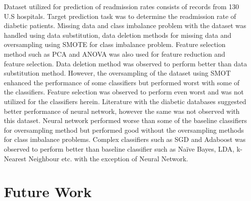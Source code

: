 \documentclass[conference]{IEEEtran}
\begin{document}
Dataset utilized for prediction of readmission rates consists of records from 130 U.S hospitals. Target prediction task was to determine the readmission rate of diabetic patients. Missing data and class imbalance problem with the dataset was handled using data substitution, data deletion methods for missing data and oversampling using SMOTE for class imbalance problem. Feature selection method such as PCA and ANOVA was also used for feature reduction and feature selection. Data deletion method was observed to perform better than data substitution method. However, the oversampling of the dataset using SMOT enhanced the performance of some classifiers but performed worst with some of the classifiers. Feature selection was observed to perform even worst and was not utilized for the classifiers herein. Literature with the diabetic databases suggested better performance of neural network, however the same was not observed with this dataset. Neural network performed worse than some of the baseline classifiers for oversampling method but performed good without the oversampling methods for class imbalance problems. Complex classifiers such as SGD and Adaboost was observed to perform better than baseline classifier such as Naïve Bayes, LDA, k-Nearest Neighbour etc. with the exception of Neural Network. 



\section{Future Work}
\end{document}
